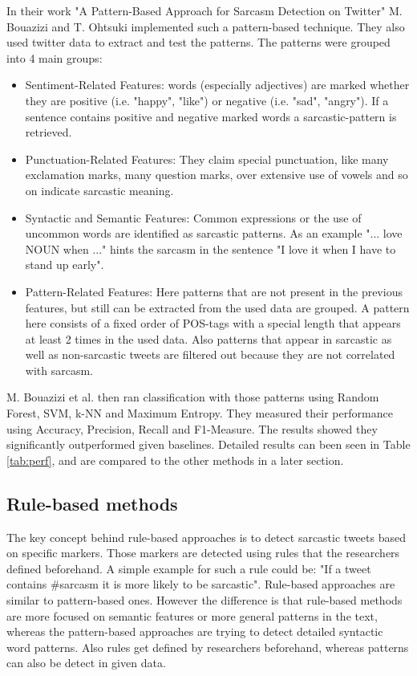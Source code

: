 \documentclass[sigconf,  review=false, nonacm=true]{acmart}
\begin{document}
In their work "A Pattern-Based Approach for Sarcasm Detection on Twitter" \cite{pattern} M. Bouazizi and T. Ohtsuki implemented such a pattern-based technique. They also used twitter data to extract and test the patterns. The patterns were grouped into 4 main groups:
\begin{itemize}
 \item Sentiment-Related Features: words (especially adjectives) are marked whether they are positive (i.e. "happy", "like") or negative (i.e. "sad", "angry"). If a sentence contains positive and negative marked words a sarcastic-pattern is retrieved.
 \item Punctuation-Related Features: They claim special punctuation, like many exclamation marks, many question marks, over extensive use of vowels and so on indicate sarcastic meaning.
 \item Syntactic and Semantic Features: Common expressions or the use of uncommon words are identified as sarcastic patterns. As an example "... love NOUN when ..." hints the sarcasm in the sentence "I love it when I have to stand up early".
 \item Pattern-Related Features: Here patterns that are not present in the previous features, but still can be extracted from the used data are grouped. A pattern here consists of a fixed order of POS-tags with a special length that appears at least 2 times in the used data. Also patterns that appear in sarcastic as well as non-sarcastic tweets are filtered out because they are not correlated with sarcasm.
\end{itemize}

M. Bouazizi et al. then ran classification with those patterns using Random Forest, SVM, k-NN and Maximum Entropy. They measured their performance using Accuracy, Precision, Recall and F1-Measure. The results showed they significantly outperformed given baselines. Detailed results can been seen in Table \ref{tab:perf}, and are compared to the other methods in a later section.


\subsection{Rule-based methods}

The key concept behind rule-based approaches is to detect sarcastic tweets based on specific markers. Those markers are detected using rules that the researchers defined beforehand. A simple example for such a rule could be: "If a tweet contains \#sarcasm it is more likely to be sarcastic". Rule-based approaches are similar to pattern-based ones. However the difference is that rule-based methods are more focused on semantic features or more general patterns in the text, whereas the pattern-based approaches are trying to detect detailed syntactic word patterns. Also rules get defined by researchers beforehand, whereas patterns can also be detect in given data.
\end{document}
